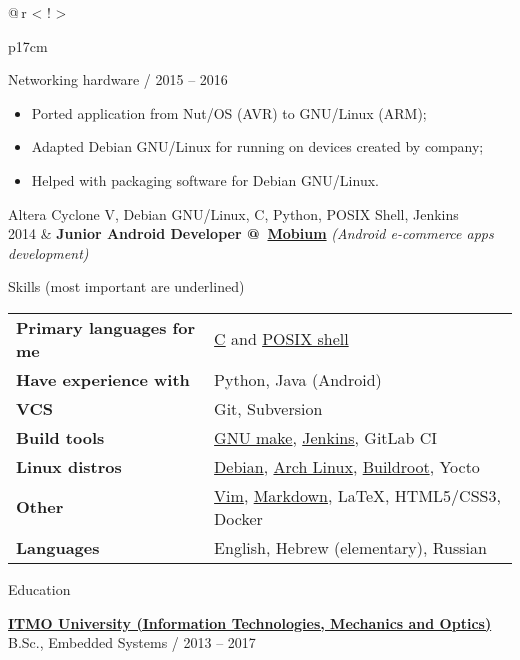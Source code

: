 \documentclass[hidelinks]{resume} %
\newcommand{\timeline}{\color{LightSteelBlue3}\makebox[0pt]{\textbullet}\hskip-0.5pt\vrule width 1pt\hspace{\labelsep}}
\begin{document}
\begin{table}[!htbp]
\begin{tabularx}{\textwidth}{@{\,}r <{\hskip 2pt} !{\timeline} >{\raggedright\arraybackslash}p{17cm}}
{\small {Networking hardware}\vspace{2mm} / 2015 -- 2016}

\begin{itemize}[leftmargin=1em]
\item Ported application from Nut/OS (AVR) to GNU/Linux (ARM);
\item Adapted Debian GNU/Linux for running on devices created by company;
\item Helped with packaging software for Debian GNU/Linux.
\end{itemize}\vspace{2mm}
{\small {Altera Cyclone V, Debian GNU/Linux, C, Python, POSIX Shell, Jenkins}}
\vspace{5mm}\\

2014 &
\textbf{Junior Android Developer @\
    \href{http://mobiumapps.com/}{Mobium}} \textit{(Android e-commerce apps development)}\\
\end{tabularx}
\end{table}


\begin{rSection}{Skills (most important are underlined)}
{
\begin{tabular}{ @{} >{\bfseries}l @{\hspace{6ex}} l }
Primary languages for me & \underline{C} and \underline{POSIX shell} \\
Have experience with & Python, Java (Android) \\
VCS & Git, Subversion \\
Build tools & \underline{GNU make}, \underline{Jenkins}, GitLab CI\\
Linux distros & \underline{Debian}, \underline{Arch Linux}, \underline{Buildroot}, Yocto\\
Other & \underline{Vim}, \underline{Markdown}, \LaTeX, HTML5/CSS3, Docker\\
Languages&  English, Hebrew (elementary), Russian\\
\end{tabular}
}

\end{rSection}


\begin{rSection}{Education}

{\href{https://en.itmo.ru/}{\textbf{ITMO University (Information Technologies, Mechanics and Optics)}}} \hfill {} \\
B.Sc., Embedded Systems / 2013 -- 2017
\end{rSection}
\end{document}
